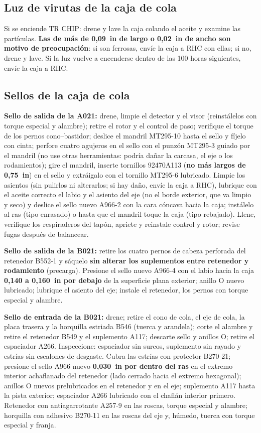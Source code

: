 \subsection{Luz de virutas de la caja de cola}

Si se enciende \textsf{TR CHIP}: drene y lave la caja colando el aceite y examine las partículas. \textbf{Las de más de 0,09~in de largo o 0,02~in de ancho son motivo de preocupación}: si son ferrosas, envíe la caja a RHC con ellas; si no, drene y lave. Si la luz vuelve a encenderse dentro de las 100 horas siguientes, envíe la caja a RHC.

\subsection{Sellos de la caja de cola}

\textbf{Sello de salida de la A021:} drene, limpie el detector y el visor (reinstálelos con torque especial y alambre); retire el rotor y el control de paso; verifique el torque de los pernos cono--bastidor; deslice el mandril MT295-10 hasta el sello y fíjelo con cinta; perfore cuatro agujeros en el sello con el punzón MT295-3 guiado por el mandril (no use otras herramientas: podría dañar la carcasa, el eje o los rodamientos); gire el mandril, inserte tornillos 92470A113 (\textbf{no más largos de 0,75~in}) en el sello y extráigalo con el tornillo MT295-6 lubricado. Limpie los asientos (sin pulirlos ni alterarlos; si hay daño, envíe la caja a RHC), lubrique con el aceite correcto el labio y el asiento del eje (no el borde exterior, que va limpio y seco) y deslice el sello nuevo A966-2 con la cara cóncava hacia la caja; instálelo al ras (tipo enrasado) o hasta que el mandril toque la caja (tipo rebajado). Llene, verifique los respiraderos del tapón, apriete y reinstale control y rotor; revise fugas después de balancear.

\textbf{Sello de salida de la B021:} retire los cuatro pernos de cabeza perforada del retenedor B552-1 y sáquelo \textbf{sin alterar los suplementos entre retenedor y rodamiento} (precarga). Presione el sello nuevo A966-4 con el labio hacia la caja \textbf{0,140 a 0,160~in por debajo} de la superficie plana exterior; anillo O nuevo lubricado; lubrique el asiento del eje; instale el retenedor, los pernos con torque especial y alambre.

\textbf{Sello de entrada de la B021:} drene; retire el cono de cola, el eje de cola, la placa trasera y la horquilla estriada B546 (tuerca y arandela); corte el alambre y retire el retenedor B549 y el suplemento A117; descarte sello y anillos O; retire el espaciador A266. Inspeccione: espaciador sin surcos, suplemento sin rayado y estrías sin escalones de desgaste. Cubra las estrías con protector B270-21; presione el sello A966 nuevo \textbf{0,030~in por dentro del ras} en el extremo interior achaflanado del retenedor (lado cerrado hacia el extremo hexagonal); anillos O nuevos prelubricados en el retenedor y en el eje; suplemento A117 hasta la pista exterior; espaciador A266 lubricado con el chaflán interior primero. Retenedor con antiagarrotante A257-9 en las roscas, torque especial y alambre; horquilla con adhesivo B270-11 en las roscas del eje y, húmedo, tuerca con torque especial y franja.

